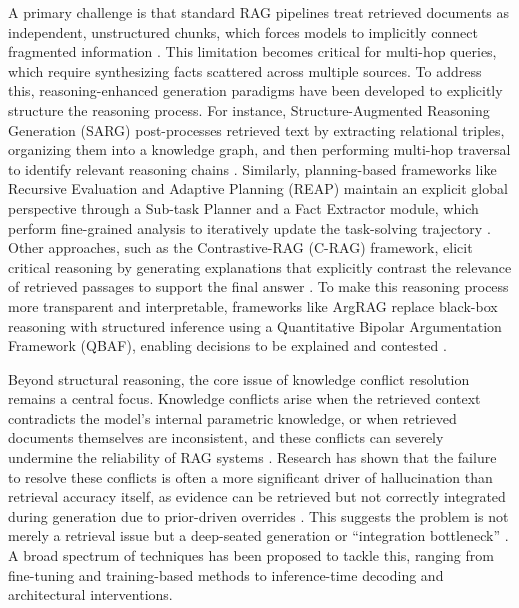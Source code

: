 \documentclass[11pt]{article}
\begin{document}
A primary challenge is that standard RAG pipelines treat retrieved documents as independent, unstructured chunks, which forces models to implicitly connect fragmented information \cite{ref172}. This limitation becomes critical for multi-hop queries, which require synthesizing facts scattered across multiple sources. To address this, reasoning-enhanced generation paradigms have been developed to explicitly structure the reasoning process. For instance, Structure-Augmented Reasoning Generation (SARG) post-processes retrieved text by extracting relational triples, organizing them into a knowledge graph, and then performing multi-hop traversal to identify relevant reasoning chains \cite{ref172}. Similarly, planning-based frameworks like Recursive Evaluation and Adaptive Planning (REAP) maintain an explicit global perspective through a Sub-task Planner and a Fact Extractor module, which perform fine-grained analysis to iteratively update the task-solving trajectory \cite{ref173}. Other approaches, such as the Contrastive-RAG (C-RAG) framework, elicit critical reasoning by generating explanations that explicitly contrast the relevance of retrieved passages to support the final answer \cite{ref174}. To make this reasoning process more transparent and interpretable, frameworks like ArgRAG replace black-box reasoning with structured inference using a Quantitative Bipolar Argumentation Framework (QBAF), enabling decisions to be explained and contested \cite{ref175}.

Beyond structural reasoning, the core issue of knowledge conflict resolution remains a central focus. Knowledge conflicts arise when the retrieved context contradicts the model's internal parametric knowledge, or when retrieved documents themselves are inconsistent, and these conflicts can severely undermine the reliability of RAG systems \cite{ref176,ref177}. Research has shown that the failure to resolve these conflicts is often a more significant driver of hallucination than retrieval accuracy itself, as evidence can be retrieved but not correctly integrated during generation due to prior-driven overrides \cite{ref178}. This suggests the problem is not merely a retrieval issue but a deep-seated generation or ``integration bottleneck'' \cite{ref179}. A broad spectrum of techniques has been proposed to tackle this, ranging from fine-tuning and training-based methods to inference-time decoding and architectural interventions.
\end{document}
